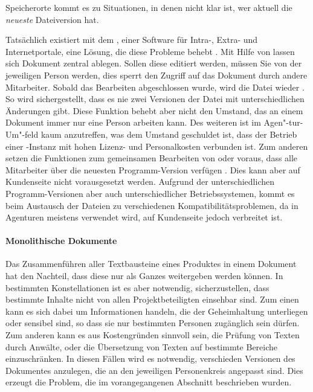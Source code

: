 Speicherorte kommt es zu Situationen, in denen nicht klar ist, wer aktuell die \emph{neueste} Dateiversion hat. 

Tatsächlich existiert mit dem  , einer Software für Intra-, Extra- und Internetportale, eine Lösung, die diese Probleme behebt \cite{sharepoint-shared-documents}. Mit Hilfe von  lassen sich Dokument zentral ablegen. Sollen diese editiert werden, müssen Sie von der jeweiligen Person  werden, dies sperrt den Zugriff auf das Dokument durch andere Mitarbeiter. Sobald das Bearbeiten abgeschlossen wurde, wird die Datei wieder . So wird sichergestellt, dass es nie zwei Versionen der Datei mit unterschiedlichen Änderungen gibt. Diese Funktion behebt aber nicht den Umstand, das an einem Dokument immer nur eine Person arbeiten kann. Des weiteren ist  im Agen"-tur-Um"-feld kaum anzutreffen, was dem Umstand geschuldet ist, dass der Betrieb einer -Instanz mit hohen Lizenz- und Personalkosten verbunden ist. Zum anderen setzen die Funktionen zum gemeinsamen Bearbeiten von  oder  voraus, dass alle Mitarbeiter über die neuesten Programm-Version verfügen \cite{sharepoint-wordversions}. Dies kann aber auf Kundenseite nicht vorausgesetzt werden. Aufgrund der unterschiedlichen Programm-Versionen aber auch unterschiedlicher Betriebssystemen, kommt es beim Austausch der Dateien zu verschiedenen Kompatibilitätsproblemen, da in Agenturen meistens  verwendet wird, auf Kundenseite jedoch  verbreitet ist.

\paragraph{Monolithische Dokumente} Das Zusammenführen aller Textbausteine eines Produktes in einem Dokument hat den Nachteil, dass diese nur als Ganzes weitergeben werden können. In bestimmten Konstellationen ist es aber notwendig, sicherzustellen, dass bestimmte Inhalte nicht von allen Projektbeteiligten einsehbar sind. Zum einen kann es sich dabei um Informationen handeln, die der Geheimhaltung unterliegen oder sensibel sind, so dass sie nur bestimmten Personen zugänglich sein dürfen. Zum anderen kann es aus Kostengründen sinnvoll sein, die Prüfung von Texten durch Anwälte, oder die Übersetzung von Texten auf bestimmte Bereiche einzuschränken. In diesen Fällen wird es notwendig, verschieden Versionen des Dokumentes anzulegen, die an den jeweiligen Personenkreis angepasst sind. Dies erzeugt die Problem, die im vorangegangenen Abschnitt beschrieben wurden.


